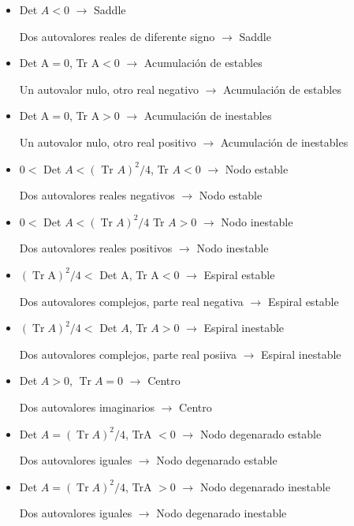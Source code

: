 \documentclass[%
 reprint,
 amsmath,amssymb,
 aps,
]{revtex4-1}
\begin{document}
\begin{itemize}
  \item Det $A<0$ 
  $\rightarrow$ Saddle
  
  Dos autovalores reales de diferente signo 
  $\rightarrow$ Saddle
  
  \item Det $\mathrm{A}=0$, Tr $\mathrm{A}<0$ 
  $\rightarrow$ Acumulación de estables
  
  Un autovalor nulo, otro real negativo 
  $\rightarrow$ Acumulación de estables
  
  \item Det $\mathrm{A}=0$, Tr $\mathrm{A}>0$ 
  $\rightarrow$ Acumulación de inestables
  
  Un autovalor nulo, otro real positivo 
  $\rightarrow$ Acumulación de inestables
  
  \item $0<$ Det $A<(\text { Tr } A)^{2} / 4$, Tr $A<0$ 
  $\rightarrow$ Nodo estable
  
  Dos autovalores reales negativos 
  $\rightarrow$ Nodo estable

  \item $0<$ Det $A<(\operatorname{Tr} A)^{2} / 4$ Tr $A>0$ 
  $\rightarrow$ Nodo inestable
  
  Dos autovalores reales positivos 
  $\rightarrow$ Nodo inestable
  
  \item $(\operatorname{Tr} \mathrm{A})^{2} / 4<$ Det $\mathrm{A}$, Tr $\mathrm{A}<0$ 
  $\rightarrow$ Espiral estable

  Dos autovalores complejos, parte real negativa 
  $\rightarrow$ Espiral estable
  
  \item $(\operatorname{Tr} A)^{2} / 4<$ Det $A$, Tr $A>0$ 
  $\rightarrow$ Espiral inestable
  
  Dos autovalores complejos, parte real posiiva 
  $\rightarrow$ Espiral inestable
  
  \item Det $A>0$, $\operatorname{Tr} A=0$
  $\rightarrow$ Centro
  
  Dos autovalores imaginarios 
  $\rightarrow$ Centro
  
  \item Det $A=(\operatorname{Tr} A)^{2} / 4$, TrA $<0$
  $\rightarrow$ Nodo degenarado estable
  
  Dos autovalores iguales   
  $\rightarrow$ Nodo degenarado estable
  
  \item Det $A=(\operatorname{Tr} A)^{2} / 4$, TrA $>0$
  $\rightarrow$ Nodo degenarado inestable
  
  Dos autovalores iguales 
  $\rightarrow$ Nodo degenarado inestable
\end{itemize}
\end{document}
